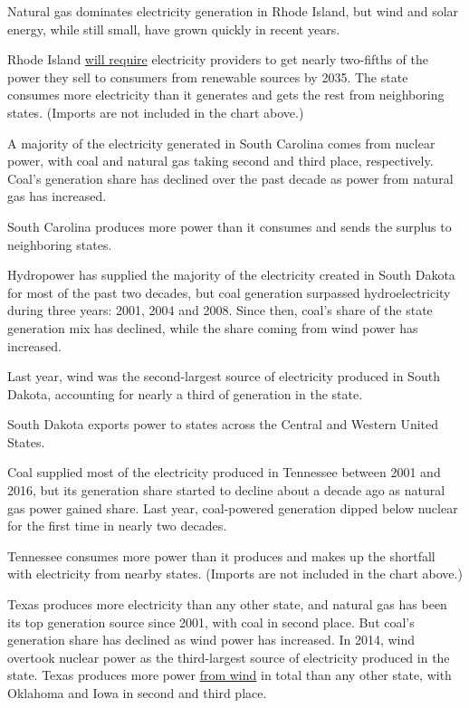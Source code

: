 Natural gas dominates electricity generation in Rhode Island, but wind
and solar energy, while still small, have grown quickly in recent years.

Rhode Island
\href{http://programs.dsireusa.org/system/program/detail/1095}{will
require} electricity providers to get nearly two-fifths of the power
they sell to consumers from renewable sources by 2035. The state
consumes more electricity than it generates and gets the rest from
neighboring states. (Imports are not included in the chart above.)

A majority of the electricity generated in South Carolina comes from
nuclear power, with coal and natural gas taking second and third place,
respectively. Coal's generation share has declined over the past decade
as power from natural gas has increased.

South Carolina produces more power than it consumes and sends the
surplus to neighboring states.

Hydropower has supplied the majority of the electricity created in South
Dakota for most of the past two decades, but coal generation surpassed
hydroelectricity during three years: 2001, 2004 and 2008. Since then,
coal's share of the state generation mix has declined, while the share
coming from wind power has increased.

Last year, wind was the second-largest source of electricity produced in
South Dakota, accounting for nearly a third of generation in the state.

South Dakota exports power to states across the Central and Western
United States.

Coal supplied most of the electricity produced in Tennessee between 2001
and 2016, but its generation share started to decline about a decade ago
as natural gas power gained share. Last year, coal-powered generation
dipped below nuclear for the first time in nearly two decades.

Tennessee consumes more power than it produces and makes up the
shortfall with electricity from nearby states. (Imports are not included
in the chart above.)

Texas produces more electricity than any other state, and natural gas
has been its top generation source since 2001, with coal in second
place. But coal's generation share has declined as wind power has
increased. In 2014, wind overtook nuclear power as the third-largest
source of electricity produced in the state. Texas produces more power
\href{https://www.nytimes3xbfgragh.onion/2019/04/03/climate/fact-check-trump-windmills.html}{from
wind} in total than any other state, with Oklahoma and Iowa in second
and third place.

